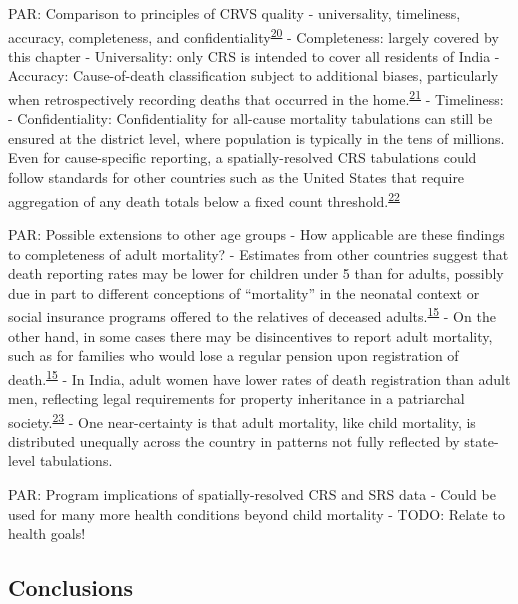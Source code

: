 \documentclass[
]{article}
\begin{document}
PAR: Comparison to principles of CRVS quality
- universality, timeliness, accuracy, completeness, and confidentiality\textsuperscript{\protect\hyperlink{ref-UnitedNationsStatisticsDivision2014}{20}}
- Completeness: largely covered by this chapter
- Universality: only CRS is intended to cover all residents of India
- Accuracy: Cause-of-death classification subject to additional biases, particularly
when retrospectively recording deaths that occurred in the home.\textsuperscript{\protect\hyperlink{ref-Kotabagi2004}{21}}
- Timeliness:
- Confidentiality: Confidentiality for all-cause mortality tabulations can still be ensured
at the district level, where population is typically in the tens of millions. Even for
cause-specific reporting, a spatially-resolved CRS tabulations could follow standards
for other countries such as the United States that require aggregation of any death
totals below a fixed count threshold.\textsuperscript{\protect\hyperlink{ref-Thacker1988}{22}}

PAR: Possible extensions to other age groups
- How applicable are these findings to completeness of adult mortality?
- Estimates from other countries suggest that death reporting rates may be lower for
children under 5 than for adults, possibly due in part to different conceptions of
``mortality'' in the neonatal context or social insurance programs offered to the
relatives of deceased adults.\textsuperscript{\protect\hyperlink{ref-Kumar2019}{15}}
- On the other hand, in some cases there may be disincentives to report adult mortality,
such as for families who would lose a regular pension upon registration of death.\textsuperscript{\protect\hyperlink{ref-Kumar2019}{15}}
- In India, adult women have lower rates of death registration than adult men, reflecting
legal requirements for property inheritance in a patriarchal society.\textsuperscript{\protect\hyperlink{ref-Gupta2016}{23}}
- One near-certainty is that adult mortality, like child mortality, is distributed unequally
across the country in patterns not fully reflected by state-level tabulations.

PAR: Program implications of spatially-resolved CRS and SRS data
- Could be used for many more health conditions beyond child mortality
- TODO: Relate to health goals!

\hypertarget{conclusions}{%
\subsection{Conclusions}\label{conclusions}}
\end{document}
